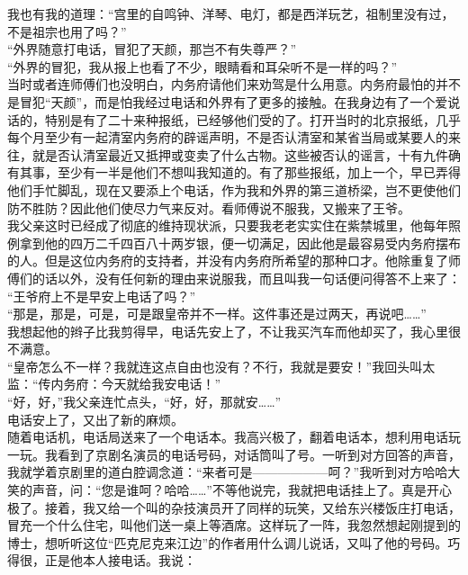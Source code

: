 我也有我的道理：“宫里的自鸣钟、洋琴、电灯，都是西洋玩艺，祖制里没有过，不是祖宗也用了吗？”\\

“外界随意打电话，冒犯了天颜，那岂不有失尊严？”\\

“外界的冒犯，我从报上也看了不少，眼睛看和耳朵听不是一样的吗？”\\

当时或者连师傅们也没明白，内务府请他们来劝驾是什么用意。内务府最怕的并不是冒犯“天颜”，而是怕我经过电话和外界有了更多的接触。在我身边有了一个爱说话的，特别是有了二十来种报纸，已经够他们受的了。打开当时的北京报纸，几乎每个月至少有一起清室内务府的辟谣声明，不是否认清室和某省当局或某要人的来往，就是否认清室最近又抵押或变卖了什么古物。这些被否认的谣言，十有九件确有其事，至少有一半是他们不想叫我知道的。有了那些报纸，加上一个，早已弄得他们手忙脚乱，现在又要添上个电话，作为我和外界的第三道桥梁，岂不更使他们防不胜防？因此他们使尽力气来反对。看师傅说不服我，又搬来了王爷。\\

我父亲这时已经成了彻底的维持现状派，只要我老老实实住在紫禁城里，他每年照例拿到他的四万二千四百八十两岁银，便一切满足，因此他是最容易受内务府摆布的人。但是这位内务府的支持者，并没有内务府所希望的那种口才。他除重复了师傅们的话以外，没有任何新的理由来说服我，而且叫我一句话便问得答不上来了：\\

“王爷府上不是早安上电话了吗？”\\

“那是，那是，可是，可是跟皇帝并不一样。这件事还是过两天，再说吧……”\\

我想起他的辫子比我剪得早，电话先安上了，不让我买汽车而他却买了，我心里很不满意。\\

“皇帝怎么不一样？我就连这点自由也没有？不行，我就是要安！”我回头叫太监：“传内务府：今天就给我安电话！”\\

“好，好，”我父亲连忙点头，“好，好，那就安……”\\

电话安上了，又出了新的麻烦。\\

随着电话机，电话局送来了一个电话本。我高兴极了，翻着电话本，想利用电话玩一玩。我看到了京剧名演员的电话号码，对话筒叫了号。一听到对方回答的声音，我就学着京剧里的道白腔调念道：“来者可是——————呵？”我听到对方哈哈大笑的声音，问：“您是谁呵？哈哈……”不等他说完，我就把电话挂上了。真是开心极了。接着，我又给一个叫的杂技演员开了同样的玩笑，又给东兴楼饭庄打电话，冒充一个什么住宅，叫他们送一桌上等酒席。这样玩了一阵，我忽然想起刚提到的博士，想听听这位“匹克尼克来江边”的作者用什么调儿说话，又叫了他的号码。巧得很，正是他本人接电话。我说：\\

